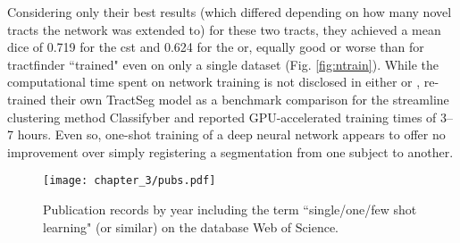 Considering only their best results (which differed depending on how many novel tracts the network was extended to) for these two tracts, they achieved a mean \gls{dice} of 0.719 for the \gls{cst} and 0.624 for the \gls{or}, equally good or worse than for tractfinder ``trained" even on only a single dataset (Fig. \ref{fig:ntrain}).
While the computational time spent on network training is not disclosed in either \textcite{Liu2023a} or \textcite{Wasserthal2018}, \textcite{Berto2021} re-trained their own TractSeg model as a benchmark comparison for the streamline clustering method Classifyber and reported GPU-accelerated training times of 3--7 hours.
Even so, one-shot training of a deep neural network appears to offer no improvement over simply registering a segmentation from one subject to another.

\begin{SCfigure}[][h!]
  \centering
  \texttt{[image: chapter\_3/pubs.pdf]}
  \caption{Publication records by year including the term ``single/one/few shot learning" (or similar) on the database Web of Science.}
  \label{fig:pubs}
\end{SCfigure}

